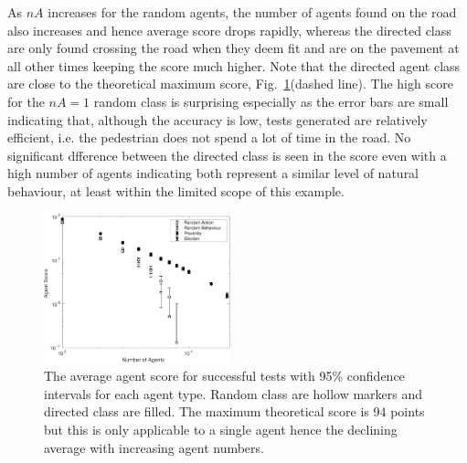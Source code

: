 \documentclass[letterpaper, 10 pt, journal, twoside]{IEEEtran}
\begin{document}
 As $nA$ increases for the random agents, the number of agents found on the road also increases and hence average score drops rapidly, whereas the directed class are only found crossing the road when they deem fit and are on the pavement at all other times keeping the score much higher.
%
 Note that the directed agent class are close to the theoretical maximum score, Fig.~\ref{AgentScore}(dashed line). 
%
The high score for the $nA=1$ random class is surprising especially as the error bars are small indicating that, although the accuracy is low, tests generated are relatively efficient, i.e. the pedestrian does not spend a lot of time in the road.
%
No significant dfference between the directed class is seen in the score even with a high number of agents indicating both represent a similar level of natural behaviour, at least within the limited scope of this example.


\begin{figure}[!t]
	\centering
\includegraphics[width=0.48\textwidth]{AgentScore.pdf}
	\caption{The average agent score for successful tests with 95\% confidence intervals for each agent type. Random class are hollow markers and directed class are filled. The maximum theoretical score is 94 points but this is only applicable to a single agent hence the declining average with increasing agent numbers.}
	\label{AgentScore}
\end{figure}


\end{document}
